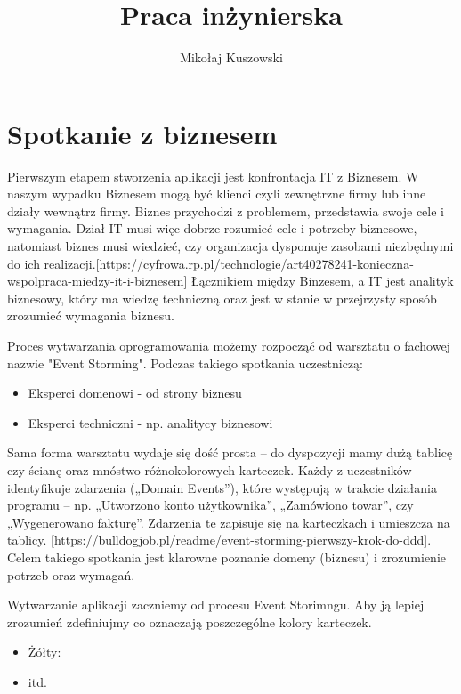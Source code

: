 \documentclass{article}
\title{Praca inżynierska}
\author{Mikołaj Kuszowski}
\begin{document}
\maketitle

\section{Spotkanie z biznesem}
      Pierwszym etapem stworzenia aplikacji jest konfrontacja IT z Biznesem. W naszym wypadku Biznesem mogą być klienci czyli zewnętrzne firmy lub inne działy wewnątrz firmy. Biznes przychodzi z problemem, przedstawia swoje cele i wymagania. Dział IT musi więc dobrze rozumieć cele i potrzeby biznesowe, natomiast biznes musi wiedzieć, czy organizacja dysponuje zasobami niezbędnymi do ich realizacji.[https://cyfrowa.rp.pl/technologie/art40278241-konieczna-wspolpraca-miedzy-it-i-biznesem] Łącznikiem między Binzesem, a IT jest analityk biznesowy, który ma wiedzę techniczną oraz jest w stanie w przejrzysty sposób zrozumieć wymagania biznesu.

      Proces wytwarzania oprogramowania możemy rozpocząć od warsztatu o fachowej nazwie "Event Storming". Podczas takiego spotkania uczestniczą:
      \begin{itemize}
            \item Eksperci domenowi - od strony biznesu
            \item Eksperci techniczni - np. analitycy biznesowi
      \end{itemize}

      Sama forma warsztatu wydaje się dość prosta – do dyspozycji mamy dużą tablicę czy ścianę oraz mnóstwo różnokolorowych karteczek. Każdy z uczestników identyfikuje zdarzenia („Domain Events”), które występują w trakcie działania programu – np. „Utworzono konto użytkownika”, „Zamówiono towar”, czy „Wygenerowano fakturę”. Zdarzenia te zapisuje się na karteczkach i umieszcza na tablicy. [https://bulldogjob.pl/readme/event-storming-pierwszy-krok-do-ddd]. Celem takiego spotkania jest klarowne poznanie domeny (biznesu) i zrozumienie potrzeb oraz wymagań.

      Wytwarzanie aplikacji zaczniemy od procesu Event Storimngu. Aby ją lepiej zrozumień zdefiniujmy co oznaczają poszczególne kolory karteczek.
      \begin{itemize}
            \item Żółty:
            \item itd.
      \end{itemize}
      
\end{document}
